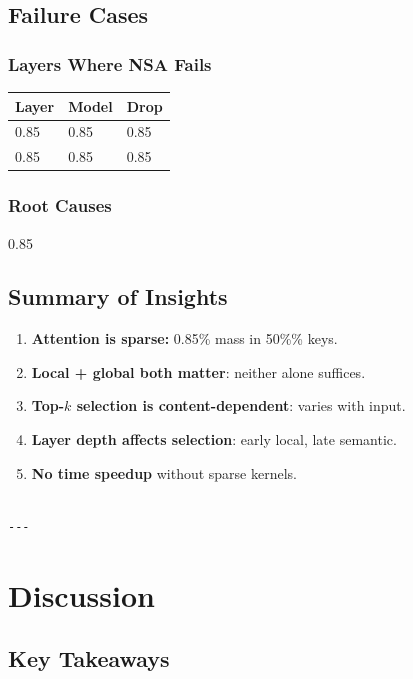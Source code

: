 \subsection{Failure Cases}

\subsubsection{Layers Where NSA Fails}

\begin{table}[H]
\centering
\small
\begin{tabular}{lll}
\toprule
\textbf{Layer} & \textbf{Model} & \textbf{Drop} \\
\midrule
0.85 & 0.85 & 0.85 \\
0.85 & 0.85 & 0.85 \\
\bottomrule
\end{tabular}
\end{table}

\subsubsection{Root Causes}

0.85

\subsection{Summary of Insights}

\begin{enumerate}
\item \textbf{Attention is sparse:} 0.85\% mass in 50\%\% keys.
\item \textbf{Local + global both matter}: neither alone suffices.
\item \textbf{Top-$k$ selection is content-dependent}: varies with input.
\item \textbf{Layer depth affects selection}: early local, late semantic.
\item \textbf{No time speedup} without sparse kernels.
\end{enumerate}
\begin{lstlisting}

---
\end{lstlisting}


\section{Discussion}

\subsection{Key Takeaways}

